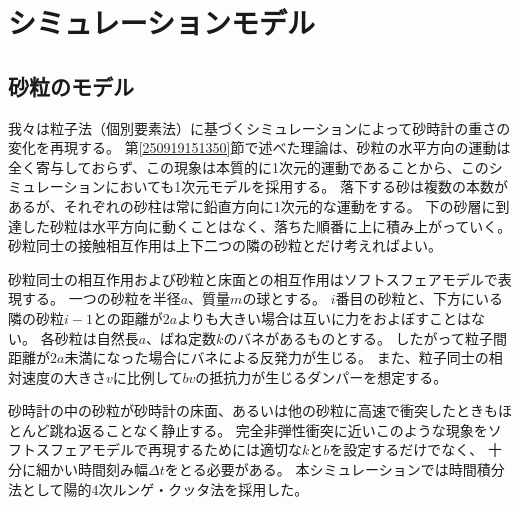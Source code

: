 \documentclass[dvipdfmx]{article}
\begin{document}
\section{シミュレーションモデル}
\subsection{砂粒のモデル}

我々は粒子法（個別要素法）に基づくシミュレーションによって砂時計の重さの変化を再現する。
第\ref{250919151350}節で述べた理論は、砂粒の水平方向の運動は全く寄与しておらず、この現象は本質的に1次元的運動であることから、このシミュレーションにおいても1次元モデルを採用する。
落下する砂は複数の本数があるが、それぞれの砂柱は常に鉛直方向に1次元的な運動をする。
下の砂層に到達した砂粒は水平方向に動くことはなく、落ちた順番に上に積み上がっていく。
砂粒同士の接触相互作用は上下二つの隣の砂粒とだけ考えればよい。


砂粒同士の相互作用および砂粒と床面との相互作用はソフトスフェアモデルで表現する。
一つの砂粒を半径$a$、質量$m$の球とする。
$i$番目の砂粒と、下方にいる隣の砂粒$i-1$との距離が$2a$よりも大きい場合は互いに力をおよぼすことはない。
各砂粒は自然長$a$、ばね定数$k$のバネがあるものとする。
したがって粒子間距離が$2a$未満になった場合にバネによる反発力が生じる。
また、粒子同士の相対速度の大きさ$v$に比例して$bv$の抵抗力が生じるダンパーを想定する。


砂時計の中の砂粒が砂時計の床面、あるいは他の砂粒に高速で衝突したときもほとんど跳ね返ることなく静止する。
完全非弾性衝突に近いこのような現象をソフトスフェアモデルで再現するためには適切な$k$と$b$を設定するだけでなく、
十分に細かい時間刻み幅$\Delta t$をとる必要がある。
本シミュレーションでは時間積分法として陽的4次ルンゲ・クッタ法を採用した。
\end{document}
